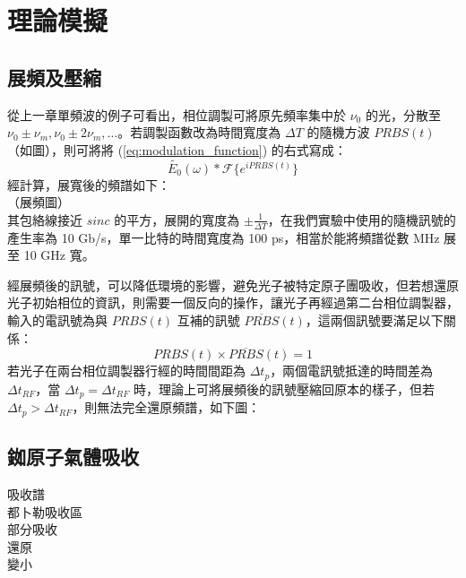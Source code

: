 \documentclass[class=NCU_thesis, crop=false]{standalone}
\begin{document}
\chapter{理論模擬}
\section{展頻及壓縮}
從上一章單頻波的例子可看出，相位調製可將原先頻率集中於 $\nu_{0}$ 的光，分散至 $\nu_{0}\pm\nu_{m}, \nu_{0}\pm2\nu_{m},\dots$。若調製函數改為時間寬度為 $\Delta T$ 的隨機方波 $PRBS(t)$ （如圖），則可將將 (\ref{eq:modulation_function}) 的右式寫成：
\begin{equation}
    \tilde{E_{0}}(\omega)*\mathscr{F}\{{e^{i PRBS(t)}}\}
\end{equation}
經計算，展寬後的頻譜如下：\\
（展頻圖）\\
其包絡線接近 $sinc$ 的平方，展開的寬度為 $\pm\frac{1}{\Delta T}$，在我們實驗中使用的隨機訊號的產生率為 10 Gb/s，單一比特的時間寬度為 100 ps，相當於能將頻譜從數 MHz 展至 10 GHz 寬。

經展頻後的訊號，可以降低環境的影響，避免光子被特定原子團吸收，但若想還原光子初始相位的資訊，則需要一個反向的操作，讓光子再經過第二台相位調製器，輸入的電訊號為與 $PRBS(t)$ 互補的訊號 $\overline{PRBS}(t)$，這兩個訊號要滿足以下關係：
\begin{equation}
    PRBS(t)\times \overline{PRBS}(t)=1
\end{equation}
若光子在兩台相位調製器行經的時間間距為 $\Delta t_{p}$，兩個電訊號抵達的時間差為 $\Delta t_{RF}$，當 $\Delta t_{p}=\Delta t_{RF}$ 時，理論上可將展頻後的訊號壓縮回原本的樣子，但若 $\Delta t_{p}>\Delta t_{RF}$，則無法完全還原頻譜，如下圖：


\section{銣原子氣體吸收}
吸收譜\\
都卜勒吸收區\\
部分吸收\\
還原\\
變小
\end{document}
